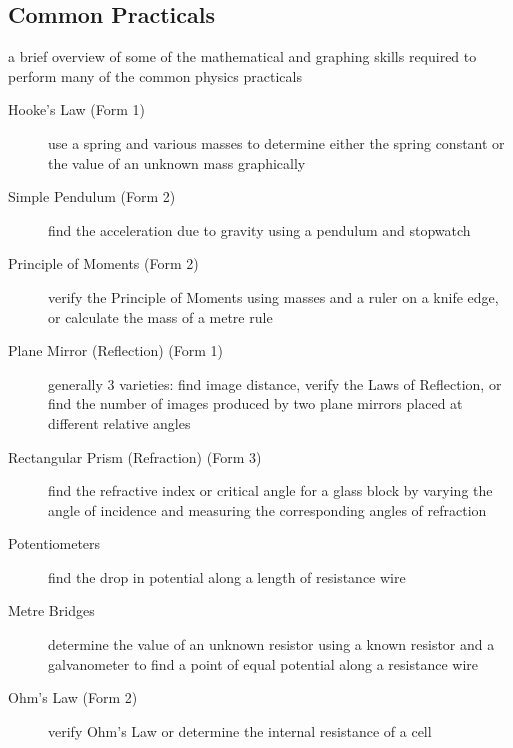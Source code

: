 \subsection{Common Practicals}
\begin{description} \itemsep1pt \parskip0pt 
\item[Mathematics]{a brief overview of some of the mathematical and graphing skills required to perform many of the common physics practicals}
\item[Mechanics] \hfill 
\begin{description} 
\item[Hooke's Law (Form 1)]{use a spring and various masses to determine either the spring constant or the value of an unknown mass graphically}
\item[Simple Pendulum (Form 2)]{find the acceleration due to gravity using a pendulum and stopwatch}
\item[Principle of Moments (Form 2)]{verify the Principle of Moments using masses and a ruler on a knife edge, or calculate the mass of a metre rule}
\end{description}
\item[Light] \hfill 
\begin{description}
\item[Plane Mirror (Reflection) (Form 1)]{generally 3 varieties: find image distance, verify the Laws of Reflection, or find the number of images produced by two plane mirrors placed at different relative angles}
\item[Rectangular Prism (Refraction) (Form 3)]{find the refractive index or critical angle for a glass block by varying the angle of incidence and measuring the corresponding angles of refraction}
\end{description}
\item[Electricity] \hfill 
\begin{description} 
\item[Potentiometers]{find the drop in potential along a length of resistance wire}
\item[Metre Bridges]{determine the value of an unknown resistor using a known resistor and a galvanometer to find a point of equal potential along a resistance wire}
\item[Ohm's Law (Form 2)]{verify Ohm's Law or determine the internal resistance of a cell}
\end{description}
\end{description}

